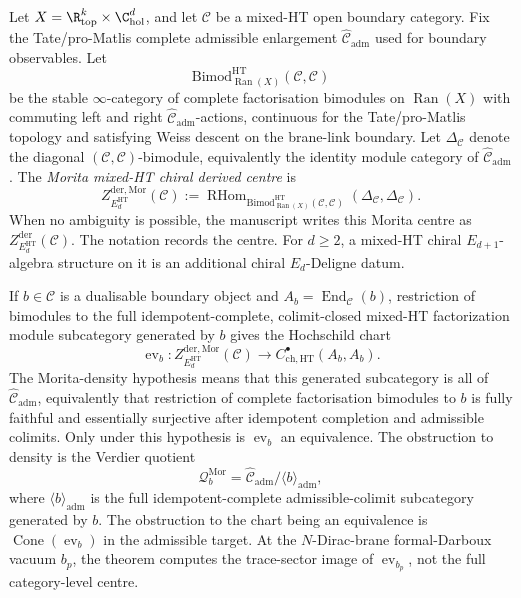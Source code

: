 \begin{defn}\label{app:defn:Z-der-HT}
Let \(X=\R^k_{\mathrm{top}}\times \C^d_{\mathrm{hol}}\), and let
\(\mathcal C\) be a mixed-HT open boundary category.  Fix the
Tate/pro-Matlis complete admissible enlargement
\(\widehat{\mathcal C}_{\mathrm{adm}}\) used for boundary observables.
Let
\[
  \mathrm{Bimod}^{\mathrm{HT}}_{\operatorname{Ran}(X)}
       (\mathcal C,\mathcal C)
\]
be the stable \(\infty\)-category of complete factorisation bimodules on
\(\operatorname{Ran}(X)\) with commuting left and right
\(\widehat{\mathcal C}_{\mathrm{adm}}\)-actions, continuous for the
Tate/pro-Matlis topology and satisfying Weiss descent on the brane-link
boundary.  Let \(\Delta_{\mathcal C}\) denote the diagonal
\((\mathcal C,\mathcal C)\)-bimodule, equivalently the identity module
category of \(\widehat{\mathcal C}_{\mathrm{adm}}\).  The
\emph{Morita mixed-HT chiral derived centre} is
\[
  Z^{\mathrm{der},\mathrm{Mor}}_{E_d^{\mathrm{HT}}}(\mathcal C)
  :=
  \operatorname{RHom}_{
    \mathrm{Bimod}^{\mathrm{HT}}_{\operatorname{Ran}(X)}
      (\mathcal C,\mathcal C)}
  (\Delta_{\mathcal C},\Delta_{\mathcal C}).
\]
When no ambiguity is possible, the manuscript writes this Morita centre
as \(Z^{\mathrm{der}}_{E_d^{\mathrm{HT}}}(\mathcal C)\).
The notation records the centre.  For \(d\geq2\), a mixed-HT
chiral \(E_{d+1}\)-algebra structure on it is an additional
chiral \(E_d\)-Deligne datum.

If \(b\in\mathcal C\) is a dualisable boundary object and
\(A_b=\operatorname{End}_{\mathcal C}(b)\), restriction of bimodules to
the full idempotent-complete, colimit-closed mixed-HT factorization
module subcategory generated by \(b\) gives the Hochschild chart
\[
  \operatorname{ev}_b\colon
  Z^{\mathrm{der},\mathrm{Mor}}_{E_d^{\mathrm{HT}}}(\mathcal C)
  \longrightarrow
  C^\bullet_{\mathrm{ch},\mathrm{HT}}(A_b,A_b).
\]
The Morita-density hypothesis means that this generated subcategory is
all of \(\widehat{\mathcal C}_{\mathrm{adm}}\), equivalently that
restriction of complete factorisation bimodules to \(b\) is fully
faithful and essentially surjective after idempotent completion and
admissible colimits.  Only under this hypothesis is
\(\operatorname{ev}_b\) an equivalence.  The obstruction to density is
the Verdier quotient
\[
  \mathcal Q_b^{\mathrm{Mor}}
  =
  \widehat{\mathcal C}_{\mathrm{adm}}
  /\langle b\rangle_{\mathrm{adm}},
\]
where \(\langle b\rangle_{\mathrm{adm}}\) is the full
idempotent-complete admissible-colimit subcategory generated by \(b\).
The obstruction to the chart being an equivalence is
\(\operatorname{Cone}(\operatorname{ev}_b)\) in the admissible target.
At the \(N\)-Dirac-brane formal-Darboux vacuum \(b_p\), the theorem
computes the trace-sector image of \(\operatorname{ev}_{b_p}\), not the
full category-level centre.
\end{defn}

